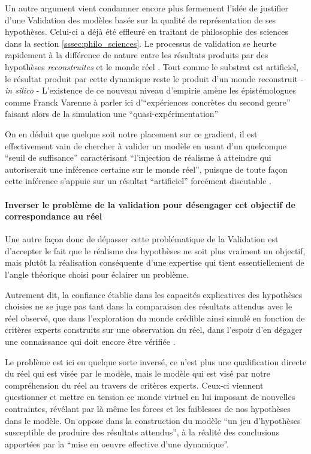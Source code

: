 Un autre argument vient condamner encore plus fermement l'idée de justifier d'une Validation des modèles basée sur la qualité de représentation de ses hypothèses. Celui-ci a déjà été effleuré en traitant de philosophie des sciences dans la section \ref{sssec:philo_sciences}. Le processus de validation se heurte rapidement à la différence de nature entre les résultats produits par des hypothèses \textit{reconstruites} et le monde réel . Tout comme le substrat est artificiel, le résultat produit par cette dynamique reste le produit d'un monde reconstruit - \textit{in silico} - L'existence de ce nouveau niveau d'empirie amène les épistémologues comme Franck Varenne à parler ici d'\enquote{expériences concrètes du second genre} faisant alors de la simulation une \enquote{quasi-expérimentation} \autocites{Varenne2001, Varenne2007, Phan2008}

On en déduit que quelque soit notre placement sur ce gradient, il est effectivement vain de chercher à valider un modèle en usant d'un quelconque \enquote{seuil de suffisance} caractérisant \enquote{l'injection de réalisme à atteindre qui autoriserait une inférence certaine sur le monde réel}, puisque de toute façon cette inférence s'appuie sur un résultat \enquote{artificiel} forcément discutable .

\paragraph{Inverser le problème de la validation pour désengager cet objectif de correspondance au réel}
\label{p:inverser_problematique}

Une autre façon donc de dépasser cette problématique de la Validation est d'accepter le fait que le réalisme des hypothèses ne soit plus vraiment un objectif, mais plutôt la réalisation conséquente d'une expertise qui tient essentiellement de l'angle théorique choisi pour éclairer un problème.

Autrement dit, la confiance établie dans les capacités explicatives des hypothèses choisies ne se juge pas tant dans la comparaison des résultats attendus avec le réel observé, que dans l'exploration du monde crédible ainsi simulé en fonction de critères experts construits sur une observation du réel, dans l'espoir d'en dégager une connaissance qui doit encore être vérifiée .

Le problème est ici en quelque sorte inversé, ce n'est plus une qualification directe du réel qui est visée par le modèle, mais le modèle qui est visé par notre compréhension du réel au travers de critères experts. Ceux-ci viennent questionner et mettre en tension ce monde virtuel en lui imposant de nouvelles contraintes, révélant par là même les forces et les faiblesses de nos hypothèses dans le modèle. On oppose dans la construction du modèle \enquote{un jeu d'hypothèses susceptible de produire des résultats attendus}, à la réalité des conclusions apportées par la \enquote{mise en oeuvre effective d'une dynamique}.

